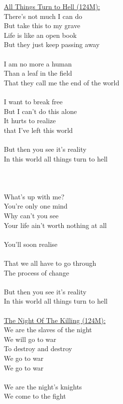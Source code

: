 \documentclass[11pt]{article}
\begin{document}
\underline{All Things Turn to Hell (124M):}\\
There's not much I can do\\
But take this to my grave\\
Life is like an open book\\
But they just keep passing away\\
\\
I am no more a human\\
Than a leaf in the field\\
That they call me the end of the world \\
\\
I want to break free\\
But I can't do this alone\\
It hurts to realize \\
that I've left this world\\
\\
But then you see it's reality\\
In this world all things turn to hell \\
\\
[Solos]\\
\\
What's up with me? \\
You're only one mind\\
Why can't you see\\
Your life ain't worth nothing at all\\
\\
You'll soon realise\\
\\
That we all have to go through\\
The process of change\\
\\
But then you see it's reality\\
In this world all things turn to hell\\
\\
\underline{The Night Of The Killing (124M):}\\
We are the slaves of the night\\
We will go to war\\
To destroy and destroy\\
We go to war\\
We go to war\\
\\
We are the night's knights\\
We come to the fight\\
\end{document}
